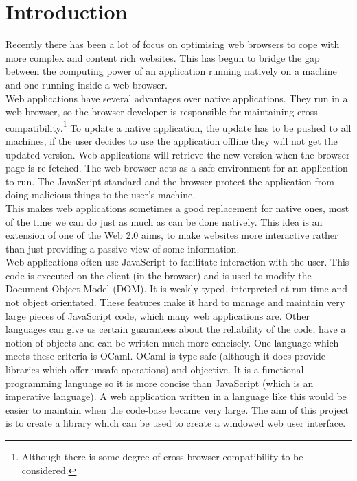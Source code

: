 \documentclass[10pt,a4paper]{article}
\begin{document}
  \section{Introduction}
  Recently there has been a lot of focus on optimising web browsers to cope with more complex and content rich websites. This has begun to bridge the gap between the computing power of an application running natively on a machine and one running inside a web browser.
  \\
  Web applications have several advantages over native applications. They run in a web browser, so the browser developer is responsible for maintaining cross compatibility.\footnote{Although there is some degree of cross-browser compatibility to be considered.} To update a native application, the update has to be pushed to all machines, if the user decides to use the application offline they will not get the updated version. Web applications will retrieve the new version when the browser page is re-fetched. The web browser acts as a safe environment for an application to run. The JavaScript standard and the browser protect the application from doing malicious things to the user's machine.
  \\
  This makes web applications sometimes a good replacement for native ones, most of the time we can do just as much as can be done natively. This idea is an extension of one of the Web 2.0 aims, to make websites more interactive rather than just providing a passive view of some information.
  \\
  Web applications often use JavaScript to facilitate interaction with the user. This code is executed on the client (in the browser) and is used to modify the Document Object Model (DOM). It is weakly typed, interpreted at run-time and not object orientated. These features make it hard to manage and maintain very large pieces of JavaScript code, which many web applications are. Other languages can give us certain guarantees about the reliability of the code, have a notion of objects and can be written much more concisely. One language which meets these criteria is OCaml. OCaml is type safe (although it does provide libraries which offer unsafe operations) and objective. It is a functional programming language so it is more concise than JavaScript (which is an imperative language). A web application written in a language like this would be easier to maintain when the code-base became very large. The aim of this project is to create a library which can be used to create a windowed web user interface.
\end{document}
